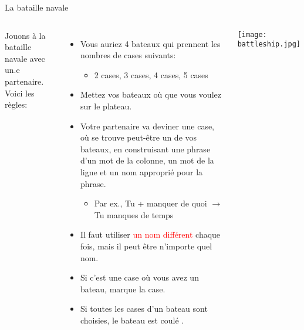 \begin{frame}{La bataille navale}
  \scriptsize
    \begin{columns}
        Jouons à la bataille navale avec un.e partenaire.
        Voici les règles:
        \begin{itemize}
          \item Vous auriez 4 bateaux qui prennent les nombres de cases  suivants:
          \begin{itemize}
            \scriptsize
            \item 2 cases, 3 cases, 4 cases, 5 cases
          \end{itemize}
          \item Mettez vos bateaux où que  vous voulez sur le plateau.
          \item Votre partenaire va deviner une case, où se trouve peut-être un de vos bateaux, en construisant une phrase d'un mot de la colonne, un mot de la ligne \alert{et un nom approprié pour la phrase}.
          \begin{itemize}
            \scriptsize
            \item Par ex., Tu + manquer de quoi $\to$ Tu manques de temps
          \end{itemize}
          \item Il faut utiliser \textcolor{red}{un nom différent} chaque fois, mais il peut être n'importe quel nom.
          \item Si c'est une case où vous avez un bateau, marque la case.
          \item Si toutes les cases d'un bateau sont choisies, le bateau est coulé .
          \end{itemize}
        \texttt{[image: battleship.jpg]}
    \end{columns}
\end{frame}